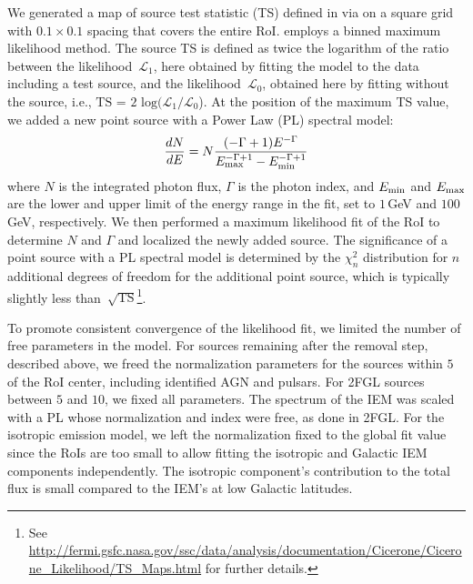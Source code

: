 {We generated a map of source test statistic (TS) defined in \citet{Mattox96} via \ptlike{} on a square grid with $0.1$\degr{}\,$\times$\,$0.1$\degr{} spacing that covers the entire RoI. \ptlike{} employs a binned maximum likelihood method. The source TS is defined as twice the logarithm of the ratio between the likelihood~$\mathcal{L}_1$, here obtained by fitting the model to the data including a test source, and the likelihood~$\mathcal{L}_0$, obtained here by fitting without the source, i.e., $\textrm{TS = 2 log}(\mathcal{L}_1/\mathcal{L}_0$). At the position of the maximum TS value, we added a new point source with a Power Law (PL) spectral model:
\begin{equation}
	\label{eqn:PL}
	\frac{dN}{dE} = N\frac{(-\Gamma+1)E^{-\Gamma}} {E_{\rm max}^{-\Gamma+1} - E_{\rm min}^{-\Gamma+1}}
\end{equation}
where $N$ is the integrated photon flux, $\Gamma$ is the photon index, and $E_{\rm min}$ and $E_{\rm max}$ are the lower and upper limit of the energy range in the fit, set to $1$\,GeV and $100$\,GeV, respectively.
We then performed a maximum likelihood fit of the RoI to determine $N$ and $\Gamma$ and localized the newly added source. 
The significance of a point source with a PL spectral model is determined by the $\chi^2_n$ distribution for $n$ additional degrees of freedom for the additional point source, which is typically slightly less than~$\sqrt{\textrm{TS}}$\footnote{See \url{http://fermi.gsfc.nasa.gov/ssc/data/analysis/documentation/Cicerone/Cicerone_Likelihood/TS_Maps.html} for further details.}.

To promote consistent convergence of the likelihood fit, we limited the number of free parameters in the model. For sources remaining after the removal step, described above, we freed the normalization parameters for the sources within $5$\degr{} of the RoI center, including identified AGN and pulsars. For 2FGL sources between $5$\degr{} and $10$\degr{}, we fixed all parameters. The spectrum of the IEM was scaled with a PL whose normalization and index were free, as done in 2FGL.
For the isotropic emission model, we left the normalization fixed to the global fit value since the RoIs are too small to allow fitting %
the isotropic and Galactic IEM components independently. The isotropic component's contribution to the total flux is small compared to the IEM's at low Galactic latitudes.

}
